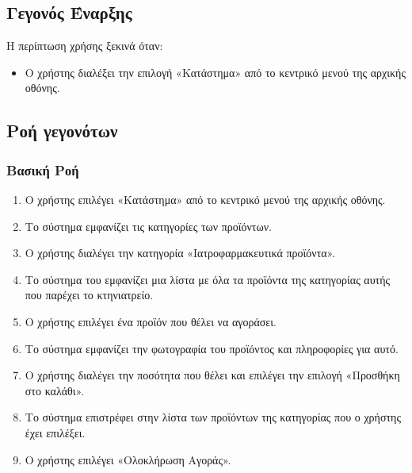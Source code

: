 \documentclass[12pt,a4paper,twoside]{book}
\begin{document}
\subsection{Γεγονός Έναρξης}
Η περίπτωση χρήσης ξεκινά όταν:
\begin{itemize}
  \item Ο χρήστης διαλέξει την επιλογή «Κατάστημα» από το κεντρικό μενού της αρχικής οθόνης. %
\end{itemize}

\subsection{Ροή γεγονότων}

\subsubsection{Βασική Ροή}
\begin{enumerate}
  \item Ο χρήστης επιλέγει «Κατάστημα» από το κεντρικό μενού της αρχικής οθόνης. %
  \item Το σύστημα εμφανίζει τις κατηγορίες των προϊόντων. %
  \item Ο χρήστης διαλέγει την κατηγορία «Ιατροφαρμακευτικά προϊόντα».  %
  \item Το σύστημα του εμφανίζει μια λίστα με όλα τα προϊόντα της κατηγορίας αυτής που παρέχει το κτηνιατρείο. %
  \item Ο χρήστης επιλέγει ένα προϊόν που θέλει να αγοράσει. %
  \item Το σύστημα εμφανίζει την φωτογραφία του προϊόντος και πληροφορίες για αυτό.  %
  \item Ο χρήστης διαλέγει την ποσότητα που θέλει και επιλέγει την επιλογή «Προσθήκη στο καλάθι». %
  \item Το σύστημα επιστρέφει στην λίστα των προϊόντων της κατηγορίας που ο χρήστης έχει επιλέξει. %
  \item Ο χρήστης επιλέγει «Ολοκλήρωση Αγοράς».
\end{enumerate}
\end{document}
